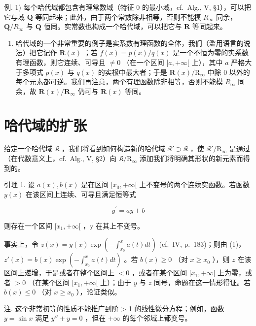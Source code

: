 例. 1) 每个哈代域都包含有理常数域（特征 0 的最小域，cf.~Alg., V, §1），可以把它与域 \(\mathbf{Q}\) 等同起来；此外，由于两个常数除非相等，否则不能模 \(R_{\infty}\) 同余， \(\mathbf{Q} / R_{\infty}\) 与 \(\mathbf{Q}\) 恒同。实常数也构成一个哈代域，可以把它与 \(\mathbf{R}\) 等同起来。

\begin{enumerate}
\def\labelenumi{\arabic{enumi})}
\setcounter{enumi}{1}
\tightlist
\item
  哈代域的一个非常重要的例子是实系数有理函数的全体，我们（滥用语言的说法）把它记作 \(\mathbf{R}(x)\) ；若 \(f(x) = p(x)/q(x)\) 是一个不恒为零的实系数有理函数，则它连续、可导且 \(\neq 0\) （在一个区间 \([a, +\infty[\) 上），其中 \(a\) 严格大于多项式 \(p(x)\) 与 \(q(x)\) 的实根中最大者；于是 \(\mathbf{R}(x)/\mathrm{R}_{\infty}\) 中除 0 以外的每个元素都可逆。我们再注意，两个有理函数除非相等，否则不能模 \(R_{\infty}\) 同余，故 \(\mathbf{R}(x)/\mathbf{R}_{\infty}\) 仍可与 \(\mathbf{R}(x)\) 等同。
\end{enumerate}

\section{哈代域的扩张}

给定一个哈代域 \(\mathfrak{K}\) ，我们将看到如何构造新的哈代域 \(\mathfrak{K}' \supset \mathfrak{K}\) ，使 \(\mathfrak{K}' / \mathrm{R}_{\infty}\) 是通过（在代数意义上，cf.~Alg., V, §2）向 \(\mathfrak{K} / \mathrm{R}_{\infty}\) 添加我们将明确其形状的新元素而得到的。

引理 1. 设 \(a(x), b(x)\) 是在区间 \([x_0, +\infty[\) 上不变号的两个连续实函数。若函数 \(y(x)\) 在该区间上连续、可导且满足恒等式

\[
y ^ {\prime} = a y + b\tag{1}
\]

则存在一个区间 \([x_{1}, +\infty[\) ，y 在其上不变号。

事实上，令 \(z(x) = y(x) \exp \left(-\int_{x_0}^x a(t)dt\right)\) (cf.~IV, p.~183)；则由 (1)， \(z'(x) = b(x) \exp \left(-\int_{x_0}^x a(t)dt\right)\) 。若 \(b(x) \geqslant 0\) （对 \(x \geqslant x_0\) ），则 \(z\) 在该区间上递增，于是或者在整个区间上 \(< 0\) ，或者在某个区间 \([x_1, +\infty[\) 上为零，或者 \(> 0\) （在某个区间 \([x_1, +\infty[\) 上）；由于 \(y\) 与 \(z\) 同号，命题在这一情形得证。若 \(b(x) \leqslant 0\) （对 \(x \geqslant x_0\) ），论证类似。

注. 这个非常初等的性质不能推广到阶 \textgreater{} 1 的线性微分方程；例如，函数 \(y = \sin x\) 满足 \(y'' + y = 0\) ，但在 \(+\infty\) 的每个邻域上都变号。

